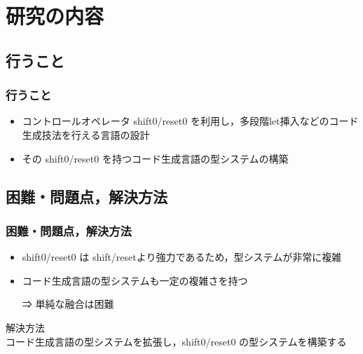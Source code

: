 \documentclass[dvipdfmx,cjk,xcolor=dvipsnames,envcountsect,notheorems,12pt]{beamer}
\theoremstyle{definition}
\begin{document}
\section{研究の内容}
\subsection{行うこと}

\begin{frame}
  \frametitle{行うこと}
  \begin{itemize}
  \item コントロールオペレータ shift0/reset0 を利用し，\alert{多段階let挿入}などのコード生成技法を行える言語の設計
  \item その shift0/reset0 を持つコード生成言語の型システムの構築
  \end{itemize}
\end{frame}

\subsection{困難・問題点，解決方法}

\begin{frame}
  \frametitle{困難・問題点，解決方法}
  \begin{itemize}
  \item \alert{shift0/reset0} は shift/resetより強力であるため，型システムが非常に複雑
  \item \alert{コード生成言語}の型システムも一定の複雑さを持つ
  \item[⇒] 単純な融合は困難
  \end{itemize}

  \pause

  解決方法\\
  コード生成言語の型システムを拡張し，shift0/reset0 の型システムを構築する
\end{frame}

\end{document}
